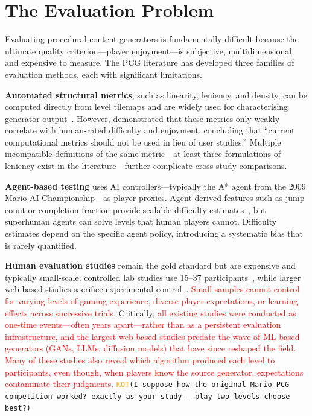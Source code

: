 \documentclass[shortabstract, mgr, english]{iithesis}
\newcommand{\DEBUG}[1]{{#1}} %
\newcommand{\KOT}[1]{\DEBUG{\tt{\textcolor{orange}{KOT}(}{#1}{)}}}
\newcommand{\changed}[1]{\textcolor{red}{#1}}
\begin{document}
\section{The Evaluation Problem}
\label{sec:intro-evaluation-problem}

Evaluating procedural content generators is fundamentally difficult because the
ultimate quality criterion---player enjoyment---is subjective, multidimensional,
and expensive to measure. The PCG literature has developed three families of
evaluation methods, each with significant limitations.

\textbf{Automated structural metrics}, such as linearity, leniency, and density,
can be computed directly from level tilemaps and are widely used for
characterising generator output~\citep{smith2010analyzing, horn2014comparative}.
However, \citet{marino2015empirical} demonstrated that these metrics only weakly
correlate with human-rated difficulty and enjoyment, concluding that ``current
computational metrics should not be used in lieu of user studies.'' Multiple
incompatible definitions of the same metric---at least three formulations of
leniency exist in the literature---further complicate cross-study comparisons.

\textbf{Agent-based testing} uses AI controllers---typically the A* agent from
the 2009 Mario AI Championship---as player proxies. Agent-derived features such
as jump count or completion fraction provide scalable difficulty
estimates~\citep{volz2018evolving}, but superhuman agents can solve levels that
human players cannot. Difficulty estimates depend on the specific agent policy,
introducing a systematic bias that is rarely quantified.

\textbf{Human evaluation studies} remain the gold standard but are expensive and
typically small-scale: controlled lab studies use 15--37
participants~\citep{shaker2011mario, marino2015empirical}, while larger web-based
studies sacrifice experimental control~\citep{pedersen2010modeling}.
\changed{Small samples cannot control for varying levels of gaming experience,
diverse player expectations, or learning effects across successive trials.}
Critically,
\changed{all existing studies were conducted as one-time events---often years
apart---rather than as a persistent evaluation infrastructure, and the largest
web-based studies predate the wave of ML-based generators (GANs, LLMs, diffusion
models) that have since reshaped the field.} \changed{Many of these studies also reveal which algorithm produced each level to participants, even though, when players know the source generator, expectations contaminate their judgments.} \KOT{I suppose how the original Mario PCG competition worked? exactly as your study - play two levels choose best?}
\end{document}
